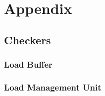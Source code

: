\chapter{Appendix}
\UseRawInputEncoding
\lstset{breaklines} 
\lstset{showstringspaces=false} 
\section{Checkers}
\subsection{Load Buffer} 


\subsection{Load Management Unit} 


